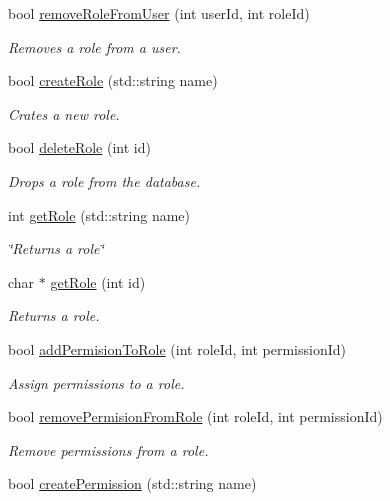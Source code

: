 \begin{DoxyCompactItemize}
bool \hyperlink{class_s_q_l_aa3d785796f5fec9fb655a5384573eacb}{remove\+Role\+From\+User} (int user\+Id, int role\+Id)
\begin{DoxyCompactList}\small\item\em Removes a role from a user. \end{DoxyCompactList}\item 
bool \hyperlink{class_s_q_l_a74e875b211592f21e4881af899e7e8a3}{create\+Role} (std\+::string name)
\begin{DoxyCompactList}\small\item\em Crates a new role. \end{DoxyCompactList}\item 
bool \hyperlink{class_s_q_l_a73b473f7777bccbe8ccb0e2fa6a122ba}{delete\+Role} (int id)
\begin{DoxyCompactList}\small\item\em Drops a role from the database. \end{DoxyCompactList}\item 
int \hyperlink{class_s_q_l_a6f535fc8ff1a6303ab95e3882c8aa313}{get\+Role} (std\+::string name)
\begin{DoxyCompactList}\small\item\em \char`\"{}\+Returns a role\char`\"{} \end{DoxyCompactList}\item 
char $\ast$ \hyperlink{class_s_q_l_a87bb8ccf2aeb9bee3b0843eda214676d}{get\+Role} (int id)
\begin{DoxyCompactList}\small\item\em Returns a role. \end{DoxyCompactList}\item 
bool \hyperlink{class_s_q_l_a34c269413c9323a7249c821740c5fb36}{add\+Permision\+To\+Role} (int role\+Id, int permission\+Id)
\begin{DoxyCompactList}\small\item\em Assign permissions to a role. \end{DoxyCompactList}\item 
bool \hyperlink{class_s_q_l_a2254fe795d047f09cf1228b5a59591af}{remove\+Permision\+From\+Role} (int role\+Id, int permission\+Id)
\begin{DoxyCompactList}\small\item\em Remove permissions from a role. \end{DoxyCompactList}\item 
bool \hyperlink{class_s_q_l_a878e54ed185a0cc9e92237da7c4032d1}{create\+Permission} (std\+::string name)

\end{DoxyCompactItemize}
